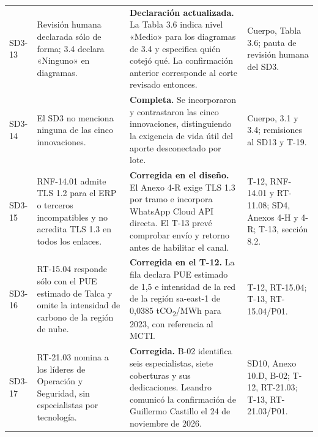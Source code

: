 \begin{longtable}{@{}P{0.10\textwidth}P{0.27\textwidth}P{0.36\textwidth}P{\tabcolsep\relax}@{}}
SD3-13 & Revisión humana declarada sólo de forma; 3.4 declara «Ninguno» en diagramas. & \textbf{Declaración actualizada.} La Tabla 3.6 indica nivel «Medio» para los diagramas de 3.4 y especifica quién cotejó qué. La confirmación anterior corresponde al corte revisado entonces. & Cuerpo, Tabla 3.6; pauta de revisión humana del SD3. \\
SD3-14 & El SD3 no menciona ninguna de las cinco innovaciones. & \textbf{Completa.} Se incorporaron y contrastaron las cinco innovaciones, distinguiendo la exigencia de vida útil del aporte desconectado por lote. & Cuerpo, 3.1 y 3.4; remisiones al SD13 y T-19. \\
SD3-15 & RNF-14.01 admite TLS 1.2 para el ERP o terceros incompatibles y no acredita TLS 1.3 en todos los enlaces. & \textbf{Corregida en el diseño.} El Anexo 4-R exige TLS 1.3 por tramo e incorpora WhatsApp Cloud API directa. El T-13 prevé comprobar envío y retorno antes de habilitar el canal. & T-12, RNF-14.01 y RT-11.08; SD4, Anexos 4-H y 4-R; T-13, sección 8.2. \\
SD3-16 & RT-15.04 responde sólo con el PUE estimado de Talca y omite la intensidad de carbono de la región de nube. & \textbf{Corregida en el T-12.} La fila declara PUE estimado de 1,5 e intensidad de la red de la región sa-east-1 de 0,0385 tCO\textsubscript{2}/MWh para 2023, con referencia al MCTI. & T-12, RT-15.04; T-13, RT-15.04/P01. \\
SD3-17 & RT-21.03 nomina a los líderes de Operación y Seguridad, sin especialistas por tecnología. & \textbf{Corregida.} B-02 identifica seis especialistas, siete coberturas y sus dedicaciones. Leandro comunicó la confirmación de Guillermo Castillo el 24 de noviembre de 2026. & SD10, Anexo 10.D, B-02; T-12, RT-21.03; T-13, RT-21.03/P01. \\
\end{longtable}

